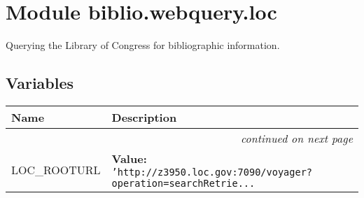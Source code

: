 %
%
%


\section{Module biblio.webquery.loc}

    \label{biblio:webquery:loc}

Querying the Library of Congress for bibliographic information.


  \subsection{Variables}

    \vspace{-1cm}
\hspace{\varindent}\begin{longtable}{|p{\varnamewidth}|p{\vardescrwidth}|l}
\cline{1-2}
\cline{1-2} \centering \textbf{Name} & \centering \textbf{Description}& \\
\cline{1-2}
\endhead\cline{1-2}\multicolumn{3}{r}{\small\textit{continued on next page}}\\\endfoot\cline{1-2}
\endlastfoot\raggedright L\-O\-C\-\_\-R\-O\-O\-T\-U\-R\-L\- & \raggedright \textbf{Value:} 
{\tt \texttt{'}\texttt{http://z3950.loc.gov:7090/voyager?operation=searchRetrie}\texttt{...}}&\\
\cline{1-2}
\end{longtable}



